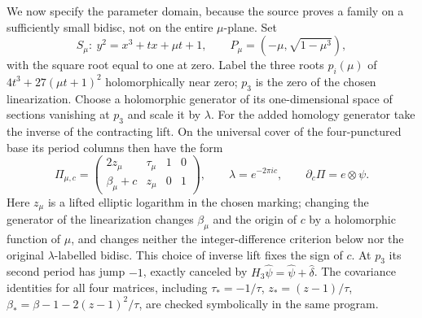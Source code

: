 We now specify the parameter domain, because the source proves
a family on a sufficiently small bidisc, not on the entire
$\mu$-plane.  Set
\[
 S_\mu:\ y^2=x^3+tx+\mu t+1,\qquad
 P_\mu=(-\mu,\sqrt{1-\mu^3}),
\]
with the square root equal to one at zero.  Label the three roots
$p_i(\mu)$ of $4t^3+27(\mu t+1)^2$ holomorphically near zero;
$p_3$ is the zero of the chosen linearization.
Choose a holomorphic generator of its one-dimensional space of
sections vanishing at $p_3$ and scale it by $\lambda$.
For the added homology generator take the inverse of the
contracting lift.  On the universal cover of the four-punctured
base its period columns then have the form
\[
 \Pi_{\mu,c}=
 \begin{pmatrix}2z_\mu&\tau_\mu&1&0\\
 \beta_\mu+c&z_\mu&0&1\end{pmatrix},
 \qquad \lambda=e^{-2\pi i c},\qquad
 \partial_c\Pi=e\otimes\psi.
\]
Here $z_\mu$ is a lifted elliptic logarithm in the chosen marking;
changing the generator of the linearization changes
$\beta_\mu$ and the origin of $c$ by a holomorphic function of
$\mu$, and changes neither the integer-difference criterion
below nor the original $\lambda$-labelled bidisc.
This choice of inverse lift fixes the sign of $c$.
At $p_3$ its second period has jump $-1$, exactly canceled by
$H_3\widehat\psi=\widehat\psi+\widehat\delta$.
The covariance identities for all four matrices, including
$\tau_*=-1/\tau$, $z_*=(z-1)/\tau$,
$\beta_* =\beta-1-2(z-1)^2/\tau$, are checked symbolically
in the same program.

